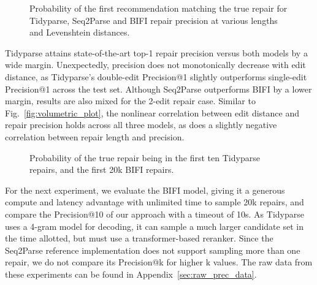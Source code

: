 \documentclass[sigplan,review,acmsmall,nonacm,screen,anonymous]{acmart}\settopmatter{printfolios=false,printccs=false,printacmref=false}
\begin{document}
\begin{figure}[h!]
\resizebox{.29\textwidth}{!}{}\hspace{0.5cm}
\resizebox{.29\textwidth}{!}{}\hspace{0.5cm}
\resizebox{.29\textwidth}{!}{}
\caption{Probability of the first recommendation matching the true repair for Tidyparse, Seq2Parse and BIFI repair precision at various lengths and Levenshtein distances.}\label{fig:len_dist_prec}
\end{figure}\vspace{-0.2cm}

Tidyparse attains state-of-the-art top-1 repair precision versus both models by a wide margin. Unexpectedly, precision does not monotonically decrease with edit distance, as Tidyparse's double-edit Precision@1 slightly outperforms single-edit Precision@1 across the test set. Although Seq2Parse outperforms BIFI by a lower margin, results are also mixed for the 2-edit repair case. Similar to Fig.~\ref{fig:volumetric_plot}, the nonlinear correlation between edit distance and repair precision holds across all three models, as does a slightly negative correlation between repair length and precision.

\begin{figure}
\resizebox{.24\textwidth}{!}{}
\resizebox{.24\textwidth}{!}{}
\caption{Probability of the true repair being in the first ten Tidyparse repairs, and the first 20k BIFI repairs.}\label{fig:len_dist_prec}
\end{figure}

For the next experiment, we evaluate the BIFI model, giving it a generous compute and latency advantage with unlimited time to sample 20k repairs, and compare the Precision@10 of our approach with a timeout of 10s. As Tidyparse uses a 4-gram model for decoding, it can sample a much larger candidate set in the time allotted, but must use a transformer-based reranker. Since the Seq2Parse reference implementation does not support sampling more than one repair, we do not compare its Precision@k for higher k values. The raw data from these experiments can be found in Appendix~\ref{sec:raw_prec_data}.

%
\end{document}

